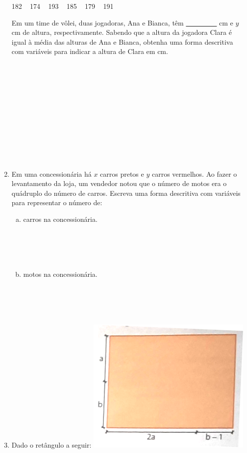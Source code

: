 \documentclass[a4paper,14pt]{article}
\begin{document}
\begin{multicols}{2}
\begin{enumerate}
    		\noindent \begin{tcolorbox}[colback=white, colframe=black, boxrule=0.5mm, width=8cm]
    			182 ~ 174 ~ 193 ~ 185 ~ 179 ~ 191
    		\end{tcolorbox}
    		Em um time de vôlei, duas jogadoras, Ana e Bianca, têm \underline{~~~~~~~~~} cm e $y$ cm de altura, respectivamente. Sabendo que a altura da jogadora Clara é igual à média das alturas de Ana e Bianca, obtenha uma forma descritiva com variáveis para indicar a altura de Clara em cm. \\\\\\\\\\\\\\\\\\\\\\\\
    		\item Em uma concessionária há $x$ carros pretos e $y$ carros vermelhos. Ao fazer o levantamento da loja, um vendedor notou que o número de motos era o quádruplo do número de carros. Escreva uma forma descritiva com variáveis para representar o número de:
    		\begin{enumerate}[a)]
    			\item carros na concessionária. \\\\\\\\\\
    			\item motos na concessionária. \\\\\\\\\\
    		\end{enumerate}
    		\item Dado o retângulo a seguir:
    		\includegraphics[width=1\linewidth]{imagens_6FMA94/imagem3}

\end{enumerate}
\end{multicols}
\end{document}
